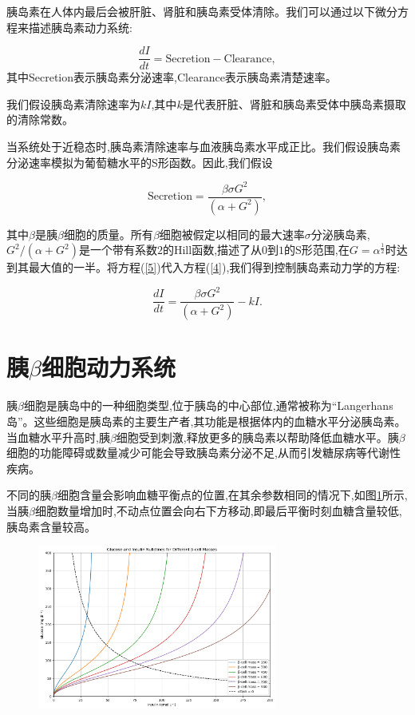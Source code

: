 胰岛素在人体内最后会被肝脏、肾脏和胰岛素受体清除。我们可以通过以下微分方程来描述胰岛素动力系统:

\begin{equation}\label{4}
    \frac{dI}{dt} = \text{Secretion} - \text{Clearance},
\end{equation}
其中Secretion表示胰岛素分泌速率,Clearance表示胰岛素清楚速率。

我们假设胰岛素清除速率为\(kI\),其中$k$是代表肝脏、肾脏和胰岛素受体中胰岛素摄取的清除常数。

当系统处于近稳态时,胰岛素清除速率与血液胰岛素水平成正比。我们假设胰岛素分泌速率模拟为葡萄糖水平的S形函数\cite{topp2000model}。因此,我们假设

\begin{equation}\label{5}
    \text{Secretion} = \frac{\beta\sigma G^2}{(\alpha + G^2)},
\end{equation}

其中$\beta$是胰$\beta$细胞的质量。所有$\beta$细胞被假定以相同的最大速率$\sigma$分泌胰岛素,\(G^2/(\alpha + G^2)\)是一个带有系数$2$的Hill函数,描述了从$0$到$1$的S形范围,在$G=\alpha^{\frac{1}{2}}$时达到其最大值的一半。将方程(\ref{5})代入方程(\ref{4}),我们得到控制胰岛素动力学的方程:

\begin{equation}
    \frac{dI}{dt} = \frac{\beta\sigma G^2}{(\alpha + G^2)} - kI.
\end{equation}

\section{胰\(\beta\)细胞动力系统}
胰$\beta$细胞是胰岛中的一种细胞类型,位于胰岛的中心部位,通常被称为“Langerhans岛”。这些细胞是胰岛素的主要生产者,其功能是根据体内的血糖水平分泌胰岛素。当血糖水平升高时,胰$\beta$细胞受到刺激,释放更多的胰岛素以帮助降低血糖水平。胰$\beta$细胞的功能障碍或数量减少可能会导致胰岛素分泌不足,从而引发糖尿病等代谢性疾病。

不同的胰$\beta$细胞含量会影响血糖平衡点的位置,在其余参数相同的情况下,如图\ref{fig:nullcline}所示,当胰$\beta$细胞数量增加时,不动点位置会向右下方移动,即最后平衡时刻血糖含量较低,胰岛素含量较高。


\begin{figure}[H]
    \centering
    \includegraphics[width=0.7\textwidth]{Img/nullcline.png}
    \centering{}
    \label{fig:nullcline}
\end{figure}

